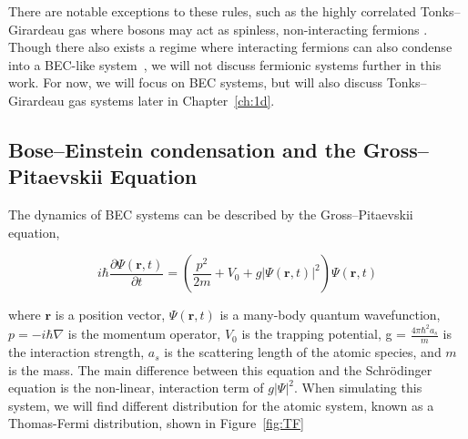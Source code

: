 There are notable exceptions to these rules, such as the highly correlated Tonks--Girardeau gas where bosons may act as spinless, non-interacting fermions \cite{Girardeau}.
Though there also exists a regime where interacting fermions can also condense into a BEC-like system~\cite{Nozieres1985, Bulgac2014}, we will not discuss fermionic systems further in this work.
For now, we will focus on BEC systems, but will also discuss Tonks--Girardeau gas systems later in Chapter~\ref{ch:1d}.


\subsection{Bose--Einstein condensation and the Gross--Pitaevskii Equation}

The dynamics of BEC systems can be described by the Gross--Pitaevskii equation, 

\begin{equation}
i \hbar \frac{\partial \Psi(\mathbf{r},t)}{\partial t} = \left(\frac{p^2}{2m} + V_0 + g |\Psi(\mathbf{r},t)|^2 \right)\Psi(\mathbf{r},t)
\label{eqn:GPE}
\end{equation}

\noindent where $\mathbf{r}$ is a position vector, $\Psi(\mathbf{r},t)$ is a many-body quantum wavefunction, $p = -i\hbar\nabla$ is the momentum operator, $V_0$ is the trapping potential, g = $\frac{4\pi\hbar^2 a_s}{m}$ is the interaction strength, $a_s$ is the scattering length of the atomic species, and $m$ is the mass.
The main difference between this equation and the Schr\"odinger equation is the non-linear, interaction term of $g|\Psi|^2$.
When simulating this system, we will find different distribution for the atomic system, known as a Thomas-Fermi distribution, shown in Figure~\ref{fig:TF}

